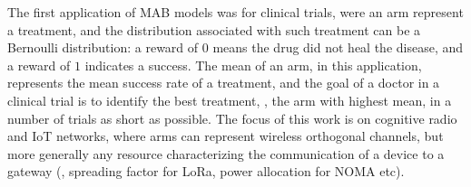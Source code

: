 The first application of MAB models was for clinical trials, were an arm represent a treatment, and the distribution associated with such treatment can be a Bernoulli distribution: a reward of $0$ means the drug did not heal the disease, and a reward of $1$ indicates a success. The mean of an arm, in this application, represents the mean success rate of a treatment, and the goal of a doctor in a clinical trial is to identify the best treatment, \ie, the arm with highest mean, in a number of trials as short as possible.
%
The focus of this work is on cognitive radio and IoT networks, where arms can represent wireless orthogonal channels, but more generally any resource characterizing the communication of a device to a gateway (\eg, spreading factor for LoRa, power allocation for NOMA etc).
%

